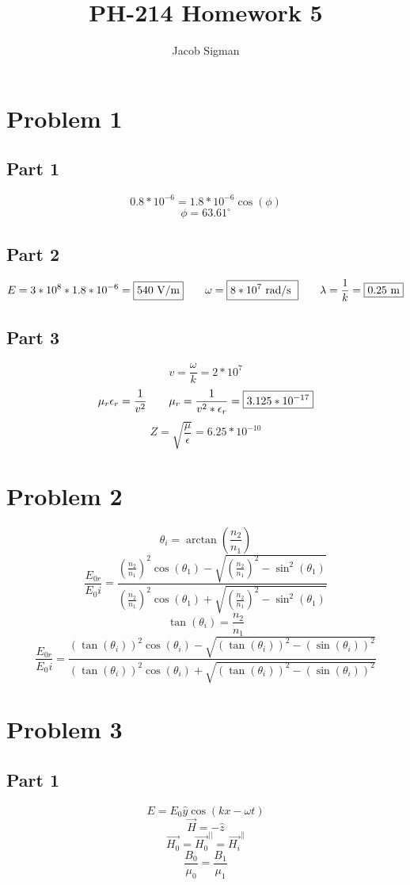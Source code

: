 \documentclass{article}
\title{PH-214 Homework 5}
\author{Jacob Sigman}
\date{}
\begin{document}
\maketitle
\section*{Problem 1}
\subsection*{Part 1}
\[0.8*10^{-6}=1.8*10^{-6}\cos(\phi)\]
\[\phi=\boxed{63.61^{\circ}}\]
\subsection*{Part 2}
\[E=3*10^8*1.8*10^{-6}=\boxed{540 \textnormal{ V/m}}\hspace{7 mm}\omega=\boxed{8*10^7 \textnormal{ rad/s }}\hspace{7 mm}\lambda=\frac{1}{k}=\boxed{0.25 \textnormal{ m}}\]
\subsection*{Part 3}
\[v=\frac{\omega}{k}=2*10^7\]
\[\mu_r\epsilon_r=\frac{1}{v^2}\hspace{7 mm}\mu_r=\frac{1}{v^2*\epsilon_r}=\boxed{3.125*10^{-17}}\]
\[Z=\sqrt{\frac{\mu}{\epsilon}}=\boxed{6.25*10^{-10}}\]
\section*{Problem 2}
\[\theta_i=\arctan\left(\frac{n_2}{n_1}\right)\]
\[\frac{E_{0r}}{E_0i}=\frac{\left(\frac{n_2}{n_1}\right)^2\cos(\theta_1)-\sqrt{\left(\frac{n_2}{n_1}\right)^2-\sin^2(\theta_1)}}{\left(\frac{n_2}{n_1}\right)^2\cos(\theta_1)+\sqrt{\left(\frac{n_2}{n_1}\right)^2-\sin^2(\theta_1)}}\]
\[\tan(\theta_i)=\frac{n_2}{n_1}\]
\[\frac{E_{0r}}{E_0i}=\frac{(\tan(\theta_i))^2\cos(\theta_i)-\sqrt{(\tan(\theta_i))^2-(\sin(\theta_i))^2}}{(\tan(\theta_i))^2\cos(\theta_i)+\sqrt{(\tan(\theta_i))^2-(\sin(\theta_i))^2}}\]
\section*{Problem 3}
\subsection*{Part 1}
\[E=E_0\hat{y}\cos(kx-\omega t)\]
\[\overrightarrow{H}=-\hat{z}\]
\[\overrightarrow{H_0}=\overrightarrow{H_0}^{||}=\overrightarrow{H_i}^{||}\]
\[\frac{B_0}{\mu_0}=\frac{B_1}{\mu_1}\]
\end{document}
